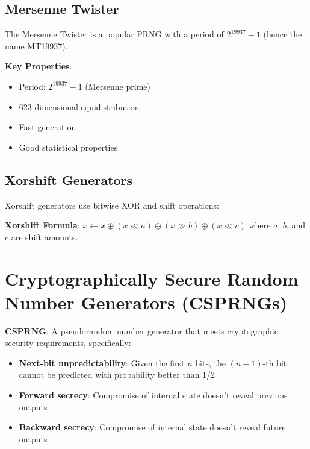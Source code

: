 \documentclass[11pt,a4paper]{article}
\begin{document}
\subsection{Mersenne Twister}

The Mersenne Twister is a popular PRNG with a period of $2^{19937} - 1$ (hence the name MT19937).

\begin{mathbox}
\textbf{Key Properties}:
\begin{itemize}
    \item Period: $2^{19937} - 1$ (Mersenne prime)
    \item 623-dimensional equidistribution
    \item Fast generation
    \item Good statistical properties
\end{itemize}
\end{mathbox}

\subsection{Xorshift Generators}

Xorshift generators use bitwise XOR and shift operations:

\begin{mathbox}
\textbf{Xorshift Formula}: $x \leftarrow x \oplus (x \ll a) \oplus (x \gg b) \oplus (x \ll c)$
where $a$, $b$, and $c$ are shift amounts.
\end{mathbox}

\section{Cryptographically Secure Random Number Generators (CSPRNGs)}

\begin{definitionbox}
\textbf{CSPRNG}: A pseudorandom number generator that meets cryptographic security requirements, specifically:
\begin{itemize}
    \item \textbf{Next-bit unpredictability}: Given the first $n$ bits, the $(n+1)$-th bit cannot be predicted with probability better than 1/2
    \item \textbf{Forward secrecy}: Compromise of internal state doesn't reveal previous outputs
    \item \textbf{Backward secrecy}: Compromise of internal state doesn't reveal future outputs
\end{itemize}
\end{definitionbox}
\end{document}
